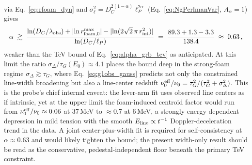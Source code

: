 \documentclass[aps,prd,onecolumn,amsmath,amssymb]{revtex4-2}
\begin{document}
via Eq.~\eqref{eq:rfoam_dyn} and $\sigma_\ell^2=D_C^{2(1-\alpha)}\ell_P^{2\alpha}$
(Eq.~\eqref{eq:NgPerlmanVar}, $A_\alpha=1$) gives
\begin{equation}
  \alpha \;\gtrsim\;
  \frac{\ln(D_C/\lambda_{\rm obs}) + |\!\ln r_{\rm foam,0}^{\rm max}|
        - |\!\ln(2\sqrt{2}\,\pi\,r_{\rm int}^2)|}
       {\ln(D_C/\ell_P)}
  \;=\; \frac{89.3 + 1.3 - 3.3}{138.4}
  \;\approx\; 0.63\,,
  \label{eq:alpha_grb_dyn}
\end{equation}
weaker than the TeV bound of Eq.~\eqref{eq:alpha_grb_tev} as anticipated.
At this limit the ratio $\sigma_\Delta/\tau_G(E_0)\approx4.1$ places the
bound deep in the strong-foam regime $\sigma_\Delta\gtrsim\tau_G$, where
Eq.~\eqref{eq:g1obs_gauss} predicts not only the constrained line-width
broadening but also a line-center redshift
$\nu_0^{\rm eff}/\nu_0=\tau_G^2/(\tau_G^2+\sigma_\Delta^2)$.  This is the
probe's chief internal caveat: the lever-arm fit uses observed line
centers as if intrinsic, yet at the upper limit the foam-induced centroid
factor would run from $\nu_0^{\rm eff}/\nu_0\approx0.06$ at $37$\,MeV to
$\approx0.7$ at $6$\,MeV, a strongly energy-dependent depression in mild
tension with the smooth $E_{\rm line}\propto t^{-1}$ Doppler-deceleration
trend in the data.  A joint center-plus-width fit is required for
self-consistency at $\alpha\approx0.63$ and would likely tighten the
bound; the present width-only result should be read as the conservative,
pedestal-independent floor beneath the primary TeV constraint.

\end{document}
